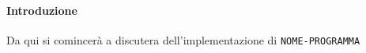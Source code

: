 \paragraph{Introduzione}
Da qui si comincerà a discutera dell'implementazione di
\texttt{NOME-PROGRAMMA}
